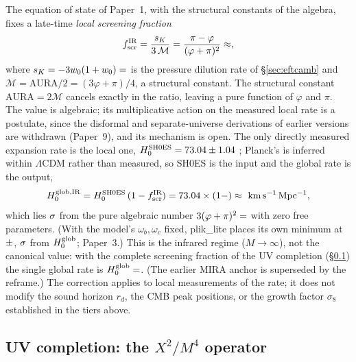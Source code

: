 \documentclass[12pt,a4paper]{article}
\newcommand{\phiG}{\varphi}
\newcommand{\MIRA}{\mathcal{M}}
\newcommand{\AURA}{\mathrm{AURA}}
\newcommand{\fscr}{f_{\mathrm{scr}}}
\newcommand{\wz}{w_0}
\begin{document}
The equation of state of Paper~1, with the structural constants of the
algebra, fixes a late-time \emph{local screening fraction}
\begin{equation}
\fscr^{\rm IR} = \frac{s_K}{3\,\MIRA}
      = \frac{\pi-\phiG}{(\phiG+\pi)^2}
      \approx \val{F_SCREEN_IR_d4} ,
\end{equation}
where $s_K = -3\wz(1+\wz) = \val{S_K_d6}$ is the pressure dilution rate of
\S\ref{sec:eftcamb} and
$\MIRA = \AURA/2 = (3\phiG+\pi)/4$, a structural constant. The structural
constant $\AURA = 2\MIRA$ cancels exactly in the ratio, leaving a pure function
of $\phiG$ and $\pi$. The value is algebraic; its multiplicative action on the
measured local rate is a postulate, since the disformal and separate-universe
derivations of earlier versions are withdrawn (Paper~9), and its mechanism is
open. The only directly measured
expansion rate is the local one, $H_0^{\rm SH0ES}=73.04\pm1.04$
\citep{Riess2022}; Planck's is inferred within $\Lambda$CDM rather than
measured, so SH0ES is the input and the global rate is the output,
\begin{equation}
H_0^{\rm glob,IR} = H_0^{\rm SH0ES}\,(1-\fscr^{\rm IR})
                = 73.04\times(1-\val{F_SCREEN_IR_d5})
                \approx \val{p9_sh0es_glob_IR}~{\rm km\,s^{-1}\,Mpc^{-1}} ,
\end{equation}
which lies $\val{p9_sh0es_sig_IR}\sigma$ from the pure algebraic number
$3(\phiG+\pi)^2=\val{H0_ALG_d5}$ with zero free parameters. (With the model's
$\omega_b,\omega_c$ fixed, plik\_lite places its own minimum at
$\val{perfil_h0_min}\pm\val{perfil_h0_sig}$, $\val{perfil_h0_d}\sigma$ from
$H_0^{\rm glob}$; Paper~3.) This is the
infrared regime ($M\to\infty$), not the canonical value: with the complete
screening fraction of the UV completion (\S\ref{sec:ext-uv}) the single global
rate is $H_0^{\rm glob}=\val{H0_GLOBAL_d5}$. (The earlier MIRA anchor is
superseded by the reframe.) The correction applies to local measurements of the rate; it does not modify the sound horizon $r_d$, the CMB peak positions, or the
growth factor $\sigma_8$ established in the tiers above.

\subsection{UV completion: the \texorpdfstring{$X^2/M^4$}{X2/M4} operator}
\label{sec:ext-uv}
\end{document}
